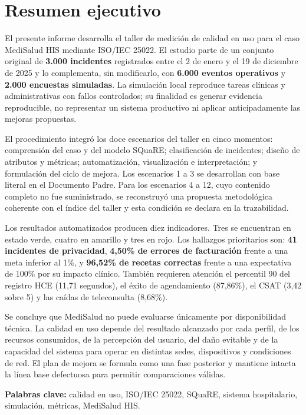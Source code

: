 \section*{Resumen ejecutivo}

El presente informe desarrolla el taller de medición de calidad en uso para el caso MediSalud HIS mediante ISO/IEC 25022. El estudio parte de un conjunto original de \textbf{3.000 incidentes} registrados entre el 2 de enero y el 19 de diciembre de 2025 y lo complementa, sin modificarlo, con \textbf{6.000 eventos operativos} y \textbf{2.000 encuestas simuladas}. La simulación local reproduce tareas clínicas y administrativas con fallos controlados; su finalidad es generar evidencia reproducible, no representar un sistema productivo ni aplicar anticipadamente las mejoras propuestas.

El procedimiento integró los doce escenarios del taller en cinco momentos: comprensión del caso y del modelo SQuaRE; clasificación de incidentes; diseño de atributos y métricas; automatización, visualización e interpretación; y formulación del ciclo de mejora. Los escenarios 1 a 3 se desarrollan con base literal en el Documento Padre. Para los escenarios 4 a 12, cuyo contenido completo no fue suministrado, se reconstruyó una propuesta metodológica coherente con el índice del taller y esta condición se declara en la trazabilidad.

Los resultados automatizados producen diez indicadores. Tres se encuentran en estado verde, cuatro en amarillo y tres en rojo. Los hallazgos prioritarios son: \textbf{41 incidentes de privacidad}, \textbf{4,50\% de errores de facturación} frente a una meta inferior al 1\%, y \textbf{96,52\% de recetas correctas} frente a una expectativa de 100\% por su impacto clínico. También requieren atención el percentil 90 del registro HCE (11,71 segundos), el éxito de agendamiento (87,86\%), el CSAT (3,42 sobre 5) y las caídas de teleconsulta (8,68\%).

Se concluye que MediSalud no puede evaluarse únicamente por disponibilidad técnica. La calidad en uso depende del resultado alcanzado por cada perfil, de los recursos consumidos, de la percepción del usuario, del daño evitable y de la capacidad del sistema para operar en distintas sedes, dispositivos y condiciones de red. El plan de mejora se formula como una fase posterior y mantiene intacta la línea base defectuosa para permitir comparaciones válidas.

\textbf{Palabras clave:} calidad en uso, ISO/IEC 25022, SQuaRE, sistema hospitalario, simulación, métricas, MediSalud HIS.

\vfill
\begin{center}
\end{center}
\clearpage
